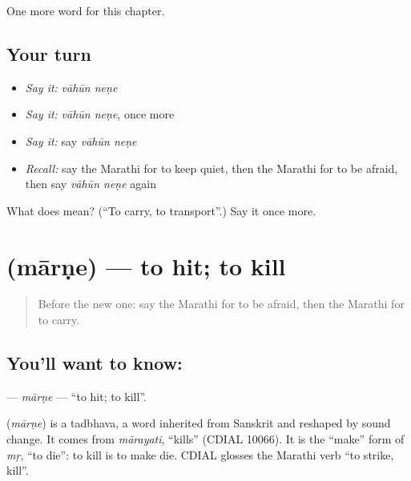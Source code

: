 \begin{grammarlens}[title={What you've built}]
One more word for this chapter.
\end{grammarlens}

\subsection*{Your turn}
\begin{itemize}
\raggedright
  \item \emph{Say it:} \emph{vāhūn neṇe}
  \item \emph{Say it:} \emph{vāhūn neṇe}, once more
  \item \emph{Say it:} say \emph{vāhūn neṇe}
  \item \emph{Recall:} say the Marathi for to keep quiet, then the Marathi for to be afraid, then say \emph{vāhūn neṇe} again
\end{itemize}

\begin{tcolorbox}[breakable,colback=teal!4,colframe=teal!35!black,title={Before you move on}]
What does   mean? (\textquotedblleft{}To carry, to transport\textquotedblright{}.) Say it once more.
\end{tcolorbox}
\section[\texorpdfstring{\mr{मारणे} (mārṇe)}{मारणे (mārṇe)}]{ (mārṇe) — to hit; to kill}

\label{lesson:MR-C166-marne}



\begin{quote}
Before the new one: say the Marathi for to be afraid, then the Marathi for to carry.
\end{quote}

\subsection*{You'll want to know: }
\textbf{} — \emph{mārṇe} — \textquotedblleft{}to hit; to kill\textquotedblright{}.

\begin{cousinweb}
\textbf{} (\emph{mārṇe}) is a tadbhava, a word inherited from Sanskrit and reshaped by sound change. It comes from \emph{mārayati}, \textquotedblleft{}kills\textquotedblright{} (CDIAL 10066). It is the \textquotedblleft{}make\textquotedblright{} form of \emph{mṛ}, \textquotedblleft{}to die\textquotedblright{}: to kill is to make die. CDIAL glosses the Marathi verb \textquotedblleft{}to strike, kill\textquotedblright{}.
\end{cousinweb}

